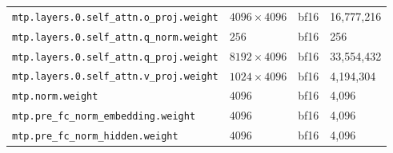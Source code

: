 \documentclass[10pt,a4paper]{article}
\theoremstyle{definition}
\begin{document}
\begin{longtable}{p{8.5cm}lll}
\texttt{mtp.\allowbreak{}layers.\allowbreak{}0.\allowbreak{}self\_attn.\allowbreak{}o\_proj.\allowbreak{}weight} & $4096 \times 4096$ & bf16 & 16,777,216 \\
\texttt{mtp.\allowbreak{}layers.\allowbreak{}0.\allowbreak{}self\_attn.\allowbreak{}q\_norm.\allowbreak{}weight} & $256$ & bf16 & 256 \\
\texttt{mtp.\allowbreak{}layers.\allowbreak{}0.\allowbreak{}self\_attn.\allowbreak{}q\_proj.\allowbreak{}weight} & $8192 \times 4096$ & bf16 & 33,554,432 \\
\texttt{mtp.\allowbreak{}layers.\allowbreak{}0.\allowbreak{}self\_attn.\allowbreak{}v\_proj.\allowbreak{}weight} & $1024 \times 4096$ & bf16 & 4,194,304 \\
\texttt{mtp.\allowbreak{}norm.\allowbreak{}weight} & $4096$ & bf16 & 4,096 \\
\texttt{mtp.\allowbreak{}pre\_fc\_norm\_embedding.\allowbreak{}weight} & $4096$ & bf16 & 4,096 \\
\texttt{mtp.\allowbreak{}pre\_fc\_norm\_hidden.\allowbreak{}weight} & $4096$ & bf16 & 4,096 \\
\end{longtable}
\end{document}
